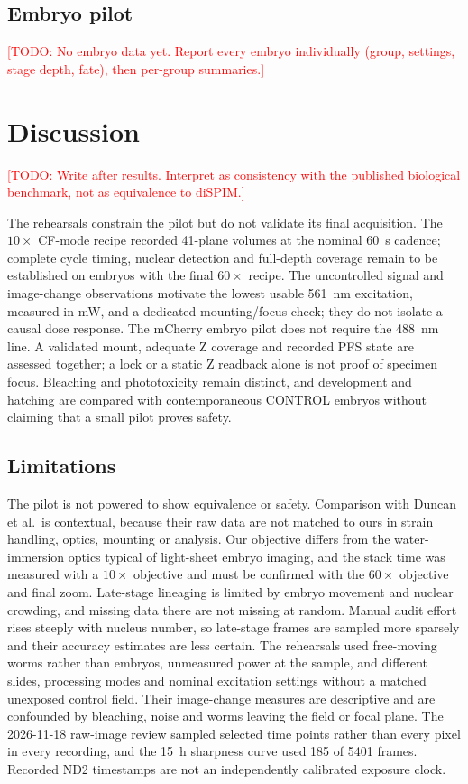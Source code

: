 \documentclass[11pt]{article}
\newcommand{\todo}[1]{\textcolor{red}{[TODO: #1]}}
\begin{document}
\subsection{Embryo pilot}
\todo{No embryo data yet. Report every embryo individually (group, settings, stage depth,
fate), then per-group summaries.}

\section{Discussion}
\todo{Write after results. Interpret as consistency with the published biological
benchmark, not as equivalence to diSPIM.}

The rehearsals constrain the pilot but do not validate its final acquisition.
The $10\times$ CF-mode recipe recorded 41-plane volumes at the nominal 60~s
cadence; complete cycle timing, nuclear detection and full-depth coverage remain
to be established on embryos with the final $60\times$ recipe. The uncontrolled
signal and image-change observations motivate the lowest usable 561~nm excitation,
measured in mW, and a dedicated mounting/focus check; they do not isolate a causal
dose response. The mCherry embryo pilot does not require the 488~nm line. A
validated mount, adequate Z coverage and recorded PFS state are assessed together;
a lock or a static Z readback alone is not proof of specimen focus. Bleaching and
phototoxicity remain distinct, and development and hatching are compared with
contemporaneous CONTROL embryos without claiming that a small pilot proves safety.

\subsection*{Limitations}
The pilot is not powered to show equivalence or safety. Comparison with Duncan
et al.\ is contextual, because their raw data are not matched to ours in strain
handling, optics, mounting or analysis. Our objective differs from the
water-immersion optics typical of light-sheet embryo imaging, and the stack time was
measured with a $10\times$ objective and must be confirmed with the $60\times$
objective and final zoom. Late-stage lineaging is limited by embryo movement and
nuclear crowding, and missing data there are not missing at random. Manual audit
effort rises steeply with nucleus number, so late-stage frames are sampled more
sparsely and their accuracy estimates are less certain. The rehearsals used
free-moving worms rather than embryos, unmeasured power at the sample, and
different slides, processing modes and nominal excitation settings without a
matched unexposed control field. Their image-change measures are descriptive and
are confounded by bleaching, noise and worms leaving the field or focal plane.
The 2026-11-18 raw-image review sampled selected time points rather than every
pixel in every recording, and the 15~h sharpness curve used 185 of 5401 frames.
Recorded ND2 timestamps are not an independently calibrated exposure clock.
\end{document}
